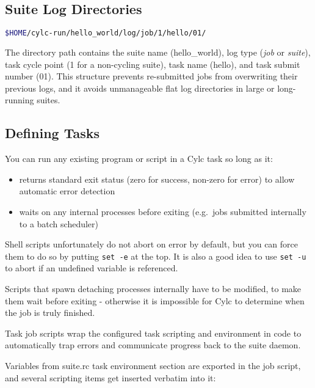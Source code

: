 \subsection{Suite Log Directories}

\begin{lstlisting}[language=bash]
$HOME/cylc-run/hello_world/log/job/1/hello/01/
\end{lstlisting}

The directory path contains the suite name (hello\_world), log type ({\em job}
or {\em suite}), task cycle point (1 for a non-cycling suite), task name
(hello), and task submit number (01). This structure prevents re-submitted jobs
from overwriting their previous logs, and it avoids unmanageable flat log
directories in large or long-running suites.

\subsection{Defining Tasks}

You can run any existing program or script in a Cylc task so long as it:
\begin{itemize}
    \item returns standard exit status (zero for success, non-zero
        for error) to allow automatic error detection
    \item waits on any internal processes before exiting (e.g.\ jobs
        submitted internally to a batch scheduler)
\end{itemize}

Shell scripts unfortunately do not abort on error by default, but you can force
them to do so by putting \lstinline=set -e= at the top.  It is also a good idea
to use \lstinline=set -u= to abort if an undefined variable is referenced. 

Scripts that spawn detaching processes internally have to be modified, to make
them wait before exiting - otherwise it is impossible for Cylc to determine
when the job is truly finished.


Task job scripts wrap the configured task scripting and environment in
code to automatically trap errors and communicate progress back to the
suite daemon.

Variables from suite.rc task environment section are exported in the job
script, and several scripting items get inserted verbatim into it:

